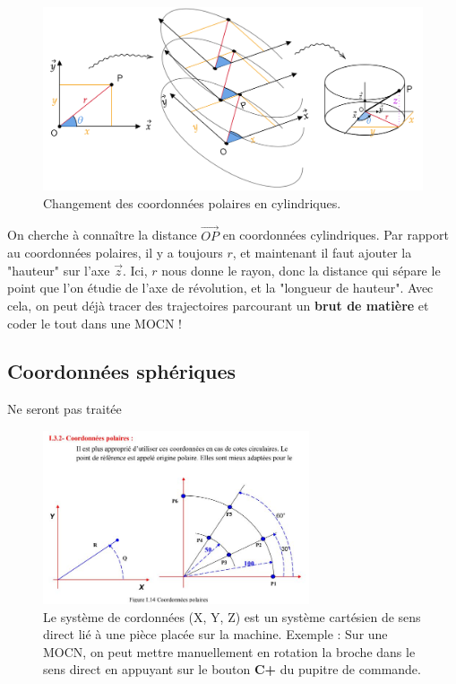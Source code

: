 \documentclass[
	11pt, %
	fleqn, %
	a4paper, %
]{LegrandOrangeBook}
\begin{document}
\begin{figure}[H] %
	\centering %
	\includegraphics[width=1\textwidth]{Images/cyl1.png} %
	\caption{Changement des coordonnées polaires en cylindriques.}
	\label{cyl1} %
\end{figure}

On cherche à connaître la distance $\Vec{OP}$ en coordonnées cylindriques. Par rapport au coordonnées polaires, il y a toujours $r$, et maintenant il faut ajouter la "hauteur" sur l'axe $\Vec{z}$. Ici, $r$ nous donne le rayon, donc la distance qui sépare le point que l'on étudie de l'axe de révolution, et la "longueur de hauteur". Avec cela, on peut déjà tracer des trajectoires parcourant un \textbf{brut de matière} et coder le tout dans une MOCN !


\subsection{Coordonnées sphériques}
Ne seront pas traitée



\begin{figure}[H] %
	\centering %
	\includegraphics[width=0.7\textwidth]{Images/pol.JPG} %
	\caption{Le système de cordonnées (X, Y, Z) est un système cartésien de sens direct lié à une pièce placée sur la machine. Exemple : Sur une MOCN, on peut mettre manuellement en rotation la broche dans le sens direct en appuyant sur le bouton \textbf{C+} du pupitre de commande.}
	\label{pol4} %
\end{figure}
\end{document}
